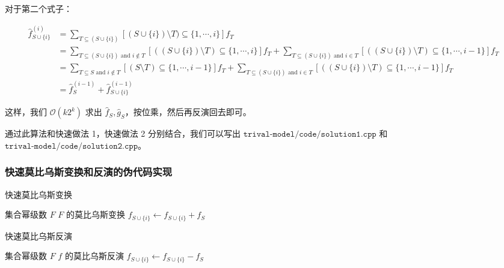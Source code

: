\documentclass[12pt]{article} %
\begin{document}
对于第二个式子：

$$
\begin{aligned}
\hat f_{S\cup\{i\}}^{(i)} &= \sum_{T \subseteq (S\cup\{i\})}[(S\cup\{i\}) \setminus T)\subseteq\{1,\cdots,i\}]f_T\\
               &= \sum_{T \subseteq (S\cup\{i\}) \text{ and } i \notin T}[((S\cup\{i\}) \setminus T)\subseteq\{1,\cdots,i\}]f_T+\sum_{T \subseteq (S\cup\{i\}) \text{ and } i \in T}[((S\cup\{i\}) \setminus T)\subseteq\{1,\cdots,i-1\}]f_T\\
               &= \sum_{T \subseteq S \text{ and } i \notin T}[(S \setminus T)\subseteq\{1,\cdots,i-1\}]f_T+\sum_{T \subseteq (S\cup\{i\}) \text{ and } i \in T}[((S\cup\{i\}) \setminus T)\subseteq\{1,\cdots,i-1\}]f_T\\
               &= \hat f_S^{(i-1)}+\hat f_{S \cup \{i\}}^{(i-1)}
\end{aligned}
$$

这样，我们 $\mathcal{O}(k2^k)$ 求出 $\hat f_S,\hat g_S$，按位乘，然后再反演回去即可。

通过此算法和快速做法 1，快速做法 2 分别结合，我们可以写出 $\texttt{trival-model/code/solution1.cpp}$ 和 $\texttt{trival-model/code/solution2.cpp}$。


\subsubsection*{快速莫比乌斯变换和反演的伪代码实现}

\begin{algorithm}
    \caption{快速莫比乌斯变换}
    \begin{algorithmic}[1]
        \Require 集合幂级数 $F$
        \Ensure $F$ 的莫比乌斯变换
                    \State $f_{S \cup \{i\}} \gets f_{S \cup \{i\}} + f_{S}$
                \EndFor
            \EndFor
            \State {}
        \EndFunction
    \end{algorithmic}
\end{algorithm}

\begin{algorithm}
    \caption{快速莫比乌斯反演}
    \begin{algorithmic}[1]
        \Require 集合幂级数 $F$
        \Ensure $f$ 的莫比乌斯反演
                    \State $f_{S \cup \{i\}} \gets f_{S \cup \{i\}} - f_{S}$
                \EndFor
            \EndFor
            \State {}
        \EndFunction
    \end{algorithmic}
\end{algorithm}
\end{document}
